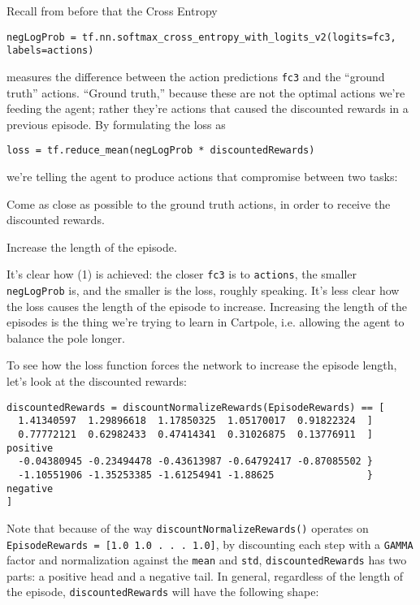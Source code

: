 \documentclass[10pt]{article}
\let\oldBeginEnumerate=\enumerate
\let\oldEndEnumerate=\endenumerate
\renewenvironment{enumerate}{
\oldBeginEnumerate
  \setlength{\itemsep}{0pt}
  \setlength{\parskip}{0pt}
  \setlength{\parsep}{0pt}
}{\oldEndEnumerate}
\theoremstyle{plain}
\theoremstyle{definition}
\theoremstyle{remark}
\newcommand{\0}{\varnothing}
\newcommand{\<}{\langle}
\renewcommand{\>}{\rangle}
\begin{document}
Recall from before that the Cross Entropy

\tiny
\begin{lstlisting}
negLogProb = tf.nn.softmax_cross_entropy_with_logits_v2(logits=fc3, labels=actions)
\end{lstlisting}
\normalsize
measures the difference between the action predictions \lstinline{fc3} and the ``ground truth'' actions. ``Ground truth,'' because these are not the optimal actions we're feeding the agent; rather they're actions that caused the discounted rewards in a previous episode. By formulating the loss as

\footnotesize
\begin{lstlisting}
loss = tf.reduce_mean(negLogProb * discountedRewards)
\end{lstlisting}
\normalsize
we're telling the agent to produce actions that compromise between two tasks:

\begin{enumerate}
  \item Come as close as possible to the ground truth actions, in order to receive the discounted rewards.
  \item Increase the length of the episode.
\end{enumerate}

It's clear how (1) is achieved: the closer \lstinline{fc3} is to \lstinline{actions}, the smaller \lstinline{negLogProb} is, and the smaller is the loss, roughly speaking. It's less clear how the loss causes the length of the episode to increase. Increasing the length of the episodes is the thing we're trying to learn in Cartpole, i.e. allowing the agent to balance the pole longer.

To see how the loss function forces the network to increase the episode length, let's look at the discounted rewards:

\tiny
\begin{lstlisting}
discountedRewards = discountNormalizeRewards(EpisodeRewards) == [
  1.41340597  1.29896618  1.17850325  1.05170017  0.91822324  ]
  0.77772121  0.62982433  0.47414341  0.31026875  0.13776911  ] positive
  -0.04380945 -0.23494478 -0.43613987 -0.64792417 -0.87085502 }
  -1.10551906 -1.35253385 -1.61254941 -1.88625                } negative
]
\end{lstlisting}
\normalsize
Note that because of the way \lstinline{discountNormalizeRewards()} operates on \lstinline{EpisodeRewards = [1.0 1.0 . . . 1.0]}, by discounting each step with a \lstinline{GAMMA} factor and normalization against the \lstinline{mean} and \lstinline{std}, \lstinline{discountedRewards} has two parts: a positive head and a negative tail. In general, regardless of the length of the episode, \lstinline{discountedRewards} will have the following shape:
\end{document}

